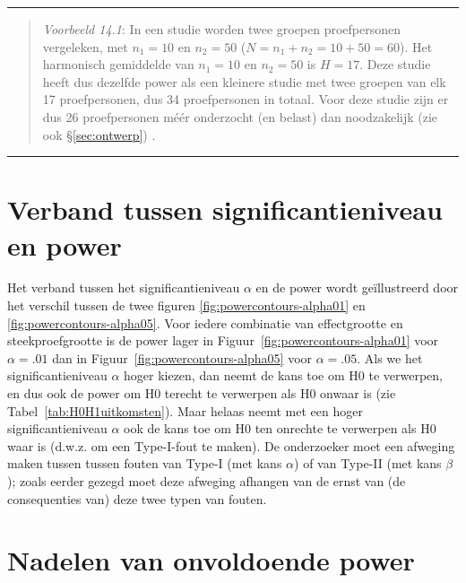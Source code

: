 \documentclass[
]{book}
\begin{document}
\begin{center}\rule{0.5\linewidth}{0.5pt}\end{center}

\begin{quote}
\emph{Voorbeeld 14.1}: In een studie worden twee groepen proefpersonen vergeleken, met \(n_1=10\) en \(n_2=50\) (\(N=n_1+n_2=10+50=60\)). Het harmonisch gemiddelde van \(n_1=10\) en \(n_2=50\) is \(H=17\). Deze studie heeft dus dezelfde power als een kleinere studie met twee groepen van elk 17 proefpersonen, dus 34 proefpersonen in totaal. Voor deze studie zijn er dus 26 proefpersonen méér onderzocht (en belast) dan noodzakelijk (zie ook §\ref{sec:ontwerp}) \citep[p.295]{ACA11}.
\end{quote}

\begin{center}\rule{0.5\linewidth}{0.5pt}\end{center}

\hypertarget{sec:significantieniveau-power}{%
\section{Verband tussen significantieniveau en power}\label{sec:significantieniveau-power}}

Het verband tussen het significantieniveau \(\alpha\) en de power wordt
geïllustreerd door het verschil tussen de twee figuren
\ref{fig:powercontours-alpha01} en
\ref{fig:powercontours-alpha05}. Voor iedere combinatie van
effectgrootte en steekproefgrootte is de power lager in
Figuur~\ref{fig:powercontours-alpha01} voor \(\alpha=.01\) dan in
Figuur~\ref{fig:powercontours-alpha05} voor \(\alpha=.05\). Als we het
significantieniveau \(\alpha\) hoger kiezen, dan neemt de kans toe om H0
te verwerpen, en dus ook de power om H0 terecht te verwerpen als H0
onwaar is (zie
Tabel~\ref{tab:H0H1uitkomsten}). Maar helaas neemt met een hoger
significantieniveau \(\alpha\) ook de kans toe om H0 ten onrechte te
verwerpen als H0 waar is (d.w.z. om een Type-I-fout te maken). De
onderzoeker moet een afweging maken tussen tussen fouten van Type-I (met
kans \(\alpha\)) of van Type-II (met kans \(\beta\)); zoals eerder gezegd
moet deze afweging afhangen van de ernst van (de consequenties van) deze
twee typen van fouten.

\hypertarget{nadelen-van-onvoldoende-power}{%
\section{Nadelen van onvoldoende power}\label{nadelen-van-onvoldoende-power}}
\end{document}
